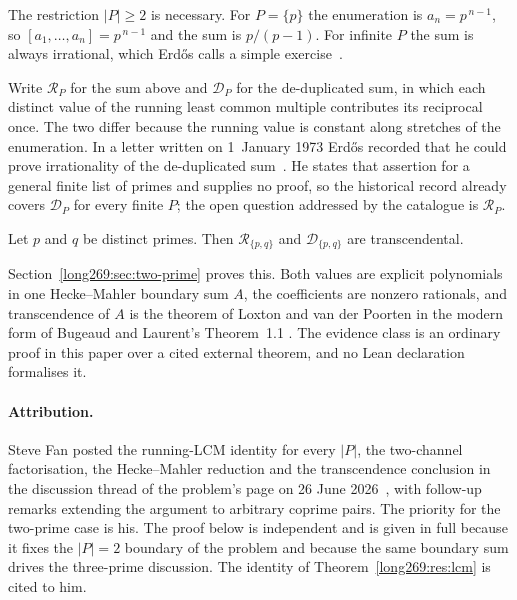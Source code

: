 The restriction $|P|\ge2$ is necessary.  For $P=\{p\}$ the enumeration is
$a_n=p^{\,n-1}$, so $[a_1,\ldots,a_n]=p^{\,n-1}$ and the sum is $p/(p-1)$.  For
infinite $P$ the sum is always irrational, which Erd\H{o}s calls a simple
exercise~\cite[p.~106]{erdos1988}.

Write $\mathcal R_P$ for the sum above and $\mathcal D_P$ for the
de-duplicated sum, in which each distinct value of the running least common
multiple contributes its reciprocal once.  The two differ because the running
value is constant along stretches of the enumeration.  In a letter written on
1~January 1973 Erd\H{o}s recorded that he could prove irrationality of the
de-duplicated sum~\cite[p.~335]{erdos1974letter}.  He states that assertion for
a general finite list of primes and supplies no proof, so the historical record
already covers $\mathcal D_P$ for every finite $P$; the open question addressed
by the catalogue is $\mathcal R_P$.

\begin{theorem}\label{long269:res:lead-two-prime}
Let $p$ and $q$ be distinct primes.  Then $\mathcal R_{\{p,q\}}$ and
$\mathcal D_{\{p,q\}}$ are transcendental.
\end{theorem}

Section~\ref{long269:sec:two-prime} proves this.  Both values are explicit polynomials
in one Hecke--Mahler boundary sum $A$, the coefficients are nonzero rationals,
and transcendence of $A$ is the theorem of Loxton and van der Poorten
\cite[p.~40, Theorem~8]{loxtonvdp1977} in the modern form of Bugeaud and Laurent's
Theorem~1.1 \cite[p.~61, Theorem~1.1]{bugeaudlaurent2023}.  The evidence class
is an ordinary proof in this paper over a cited external theorem, and no Lean
declaration formalises it.

\paragraph{Attribution.}
Steve Fan posted the running-LCM identity for every $|P|$, the two-channel
factorisation, the Hecke--Mahler reduction and the transcendence conclusion in
the discussion thread of the problem's page on 26 June
2026~\cite{fan2026comment}, with follow-up remarks extending the argument to
arbitrary coprime pairs.  The priority for the two-prime case is his.  The
proof below is independent and is given in full because it fixes the $|P|=2$
boundary of the problem and because the same boundary sum drives the
three-prime discussion.  The identity of Theorem~\ref{long269:res:lcm} is cited to him.

